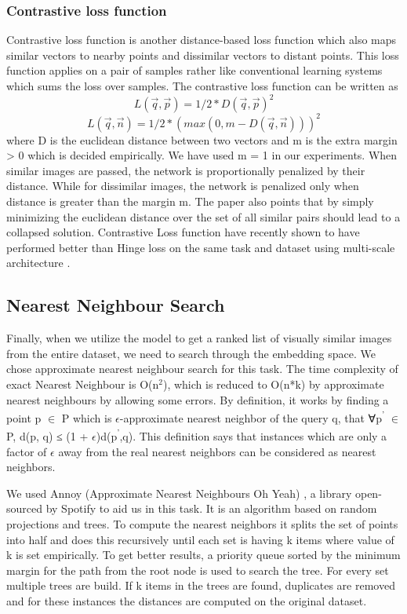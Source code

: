 \documentclass[10pt,twocolumn,letterpaper]{article}
\begin{document}
\subsubsection{Contrastive loss function}
Contrastive loss function \cite{c23} is another distance-based loss function which also maps similar vectors to nearby points and dissimilar vectors to distant points. This loss function applies on a pair of samples rather like conventional learning systems which sums the loss over samples. The contrastive loss function can be written as
\begin{equation}
 L(\Vec{q},\Vec{p}) = 1/2*D(\Vec{q},\Vec{p})^2 
\end{equation}
\begin{equation}
 L(\Vec{q},\Vec{n}) = 1/2*(max(0, m - D(\Vec{q},\Vec{n})))^2
\end{equation}
where D is the euclidean distance between two vectors and m is the extra margin > 0 which is decided empirically. We have used m = 1 in our experiments.
When similar images are passed, the network is proportionally penalized by their distance. While for dissimilar images, the network is penalized only when distance is greater than the margin m. The paper also points that by simply minimizing the euclidean distance over the set of all similar pairs should lead to a collapsed solution. Contrastive Loss function have recently shown to have performed better than Hinge loss on the same task and dataset using multi-scale architecture \cite{c3}.

\subsection{Nearest Neighbour Search}
Finally, when we utilize the model to get a ranked list of visually similar images from the entire dataset, we need to search through the embedding space. We chose approximate nearest neighbour search for this task. The time complexity of exact Nearest Neighbour is O(n$^2$), which is reduced to O(n*k) by approximate nearest neighbours by allowing some errors. By definition, it works by finding a point p $\in$ P which is $\epsilon$-approximate nearest neighbor of the query q, that ∀p\textsuperscript{'} $\in$ P, d(p, q) ≤ (1 + $\epsilon$)d(p\textsuperscript{'},q). This definition says that instances which are only a factor of $\epsilon$ away from the real nearest neighbors can be considered as nearest neighbors.

We used Annoy (Approximate Nearest Neighbours Oh Yeah) \cite{c32,c33}, a library open-sourced by Spotify to aid us in this task. It is an algorithm based on random projections and trees. To compute the nearest neighbors it splits the set of points into half and does this recursively until each set is having k items where value of k is set empirically. To get better results, a priority queue sorted by the minimum margin for the path from the root node is used to search the tree. For every set multiple trees are build. If k items in the trees are found, duplicates are removed and for these instances the distances are computed on the original dataset.
\end{document}
